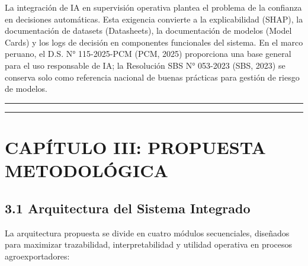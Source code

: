 La integración de IA en supervisión operativa plantea el problema de la
confianza en decisiones automáticas. Esta exigencia convierte a la
explicabilidad (SHAP), la documentación de datasets (Datasheets), la
documentación de modelos (Model Cards) y los logs de decisión en
componentes funcionales del sistema. En el marco peruano, el D.S. N°
115-2025-PCM (PCM, 2025) proporciona una base general para el uso
responsable de IA; la Resolución SBS N° 053-2023 (SBS, 2023) se conserva
solo como referencia nacional de buenas prácticas para gestión de riesgo
de modelos.

\begin{center}\rule{0.5\linewidth}{0.5pt}\end{center}

\begin{center}\rule{0.5\linewidth}{0.5pt}\end{center}

\section{CAPÍTULO III: PROPUESTA
METODOLÓGICA}\label{capuxedtulo-iii-propuesta-metodoluxf3gica}

\subsection{3.1 Arquitectura del Sistema
Integrado}\label{arquitectura-del-sistema-integrado}

La arquitectura propuesta se divide en cuatro módulos secuenciales,
diseñados para maximizar trazabilidad, interpretabilidad y utilidad
operativa en procesos agroexportadores:

